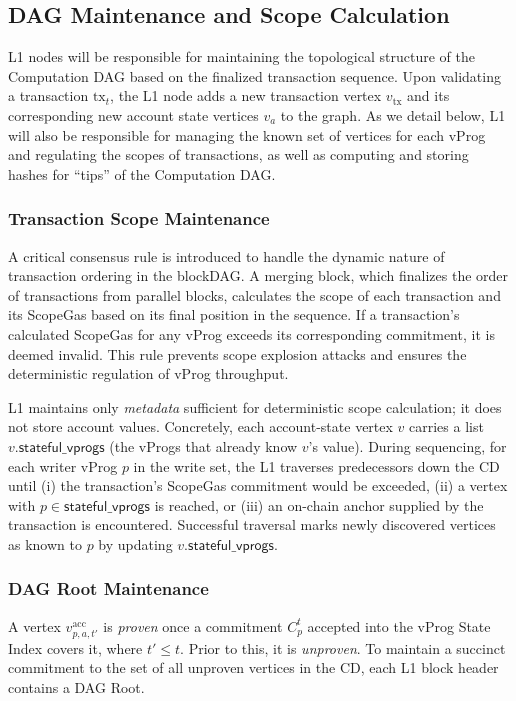 \documentclass[onecolumn, 9pt, a4paper]{extarticle}
\begin{document}
\subsection{DAG Maintenance and Scope Calculation}
L1 nodes will be responsible for maintaining the topological structure of the Computation DAG based on the
finalized transaction sequence. Upon validating a transaction $\mathrm{tx}_t$, the L1 node adds a new transaction vertex $v_{\mathrm{tx}}$
and its corresponding new account state vertices $v_a$ to the graph. As we detail below, L1 will also be responsible
for managing the known set of vertices for each vProg and regulating the scopes of transactions, as well as
computing and storing hashes for ``tips'' of the Computation DAG.
\subsubsection{Transaction Scope Maintenance}
A critical consensus rule is introduced to handle the dynamic nature of transaction ordering in the blockDAG.
A merging block, which finalizes the order of transactions from parallel blocks, calculates the scope of each
transaction and its ScopeGas based on its final position in the sequence. If a transaction’s calculated ScopeGas
for any vProg exceeds its corresponding commitment, it is deemed invalid. This rule prevents scope explosion attacks and ensures the deterministic
regulation of vProg throughput. 

L1 maintains only \emph{metadata} sufficient for deterministic scope calculation; it does not store account values. Concretely, each account-state vertex \(v\) carries a list \(v.\mathsf{stateful\_vprogs}\) (the vProgs that already know \(v\)'s value). During sequencing, for each writer vProg \(p\) in the write set, the L1 traverses predecessors down the CD until (i) the transaction’s ScopeGas commitment would be exceeded, (ii) a vertex with \(p \in \mathsf{stateful\_vprogs}\) is reached, or (iii) an on-chain anchor supplied by the transaction is encountered. Successful traversal marks newly discovered vertices as known to \(p\) by updating \(v.\mathsf{stateful\_vprogs}\).

\subsubsection{DAG Root Maintenance}
A vertex \(v^{\mathrm{acc}}_{p,a,t'}\) is \emph{proven} once a commitment \(C^t_p\) accepted into the vProg State Index covers it, where \(t' \le t\). Prior to this, it is \emph{unproven}. To maintain a succinct commitment to the set of all unproven vertices in the CD, each L1 block header contains a DAG Root.
\end{document}

